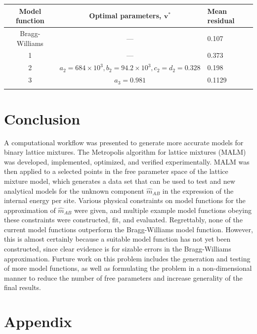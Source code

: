 \documentclass[10pt]{article}
\begin{document}
\begin{center}
\begin{tabular}{c | c | l} 
    \hline
    Model function & Optimal parameters, $\mathbf{v}^*$ & Mean residual \\  \hline
    Bragg-Williams & --- & 0.107 \\ \hline
    1 & --- & 0.373 \\ \hline
    2 & $a_2=684 \times 10^3, b_2=94.2 \times 10^3, c_2=d_2=0.328$ & 0.198 \\ \hline
    3 & $a_3 = 0.981$ & 0.1129 \\
    \label{tbl:model_errors}
\end{tabular}
\end{center}


\section{Conclusion}
A computational workflow was presented to generate more accurate models for binary lattice mixtures.
The Metropolis algorithm for lattice mixtures (MALM) was developed, implemented, optimized, and verified experimentally.
MALM was then applied to a selected points in the free parameter space of the lattice mixture model, which generates a data set that can be used to test and new analytical models for the unknown component $\hat{m}_{AB}$ in the expression of the internal energy per site.
Various physical constraints on model functions for the approximation of $\hat{m}_{AB}$ were given, and multiple example model functions obeying these constraints were constructed, fit, and evaluated.
Regrettably, none of the current model functions outperform the Bragg-Williams model function.
However, this is almost certainly because a suitable model function has not yet been constructed, since clear evidence is for sizable errors in the Bragg-Williams approximation.
Furture work on this problem includes the generation and testing of more model functions, as well as formulating the problem in a non-dimensional manner to reduce the number of free parameters and increase generality of the final results.


\clearpage
\section{Appendix}
\end{document}
